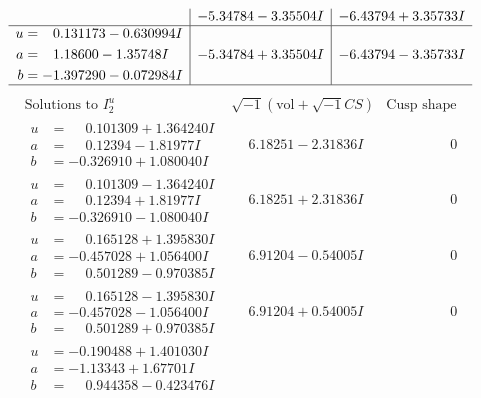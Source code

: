 \documentclass[1p]{elsarticle_modified}
\theoremstyle{definition}
\newcommand{\I}{\sqrt{-1}}
\begin{document}
$$\begin{array}{c|c|c}
 & -5.34784 - 3.35504 I & -6.43794 + 3.35733 I \\ \hline\begin{aligned}
u &= \phantom{-}0.131173 - 0.630994 I \\
a &= \phantom{-}1.18600 - 1.35748 I \\
b &= -1.397290 - 0.072984 I\end{aligned}
 & -5.34784 + 3.35504 I & -6.43794 - 3.35733 I\\
 \hline 
 \end{array}$$\newpage$$\begin{array}{c|c|c}  
\text{Solutions to }I^u_{2}& \I (\text{vol} + \sqrt{-1}CS) & \text{Cusp shape}\\
 \hline 
\begin{aligned}
u &= \phantom{-}0.101309 + 1.364240 I \\
a &= \phantom{-}0.12394 - 1.81977 I \\
b &= -0.326910 + 1.080040 I\end{aligned}
 & \phantom{-}6.18251 - 2.31836 I & \phantom{-0.000000 } 0 \\ \hline\begin{aligned}
u &= \phantom{-}0.101309 - 1.364240 I \\
a &= \phantom{-}0.12394 + 1.81977 I \\
b &= -0.326910 - 1.080040 I\end{aligned}
 & \phantom{-}6.18251 + 2.31836 I & \phantom{-0.000000 } 0 \\ \hline\begin{aligned}
u &= \phantom{-}0.165128 + 1.395830 I \\
a &= -0.457028 + 1.056400 I \\
b &= \phantom{-}0.501289 - 0.970385 I\end{aligned}
 & \phantom{-}6.91204 - 0.54005 I & \phantom{-0.000000 } 0 \\ \hline\begin{aligned}
u &= \phantom{-}0.165128 - 1.395830 I \\
a &= -0.457028 - 1.056400 I \\
b &= \phantom{-}0.501289 + 0.970385 I\end{aligned}
 & \phantom{-}6.91204 + 0.54005 I & \phantom{-0.000000 } 0 \\ \hline\begin{aligned}
u &= -0.190488 + 1.401030 I \\
a &= -1.13343 + 1.67701 I \\
b &= \phantom{-}0.944358 - 0.423476 I\end{aligned}

\end{array}$$
\end{document}
